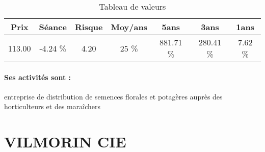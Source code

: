 \documentclass[11pt,a4paper]{report}%
\begin{document}
\begin{table}[H]
  \centering
    \begin{tabular}{|c|c|c|c|c|c|c|}
    \hline
    Prix & Séance & Risque  & Moy/ans & 5ans & 3ans & 1ans \\
    \hline
    113.00 &    -4.24 \%    & 4.20 & 25 \% & 881.71 \% & 280.41 \% & 7.62 \% \\
    \hline
    \end{tabular}%
        \label{tab:table_GRAINES VOLTZ}%
      \caption{Tableau de valeurs}
\end{table}%

\paragraph{Ses activités sont : } entreprise de distribution de semences florales et potagères auprès des horticulteurs et des maraîchers 
    
    \newpage

\section{VILMORIN CIE}
\end{document}
